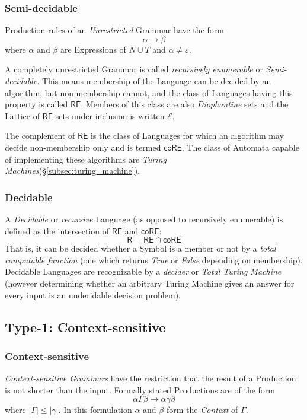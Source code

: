 \documentclass{article}
\begin{document}
\subsubsection{Semi-decidable}\label{subsec:semidecidable}
Production rules of an \emph{Unrestricted} Grammar have the form
\[
    \alpha \rightarrow \beta
\]
where $\alpha$ and $\beta$ are Expressions of $N \cup T$ and $\alpha
\neq \varepsilon$.

A completely unrestricted Grammar is called \emph{recursively
  enumerable} or \emph{Semi-decidable}. This means membership of the
Language can be decided by an algorithm, but non-membership cannot,
and the class of Languages having this property is called
$\mathsf{RE}$. Members of this class are also \emph{Diophantine} sets
and the Lattice of $\mathsf{RE}$ sets under inclusion is written
$\mathcal{E}$. %

The complement of $\mathsf{RE}$ is the class of Languages for which
an algorithm may decide non-membership only and is termed
$\mathsf{coRE}$. The class of Automata capable of implementing these
algorithms are \emph{Turing Machines}(\S\ref{subsec:turing_machine}).

\subsubsection{Decidable}\label{subsec:decidability}
A \emph{Decidable} or \emph{recursive} Language (as opposed to
recursively enumerable) is defined as the intersection of
$\mathsf{RE}$ and $\mathsf{coRE}$:
\[
    \mathsf{R} = \mathsf{RE} \cap \mathsf{coRE}
\]
That is, it can be decided whether a Symbol is a member or not by a
\emph{total computable function} (one which returns \emph{True} or
\emph{False} depending on membership). Decidable Languages are
recognizable by a \emph{decider} or \emph{Total Turing
  Machine}\cite{kozen97} (however determining whether an arbitrary
Turing Machine gives an answer for every input is an undecidable
decision problem).

\subsection{Type-1: Context-sensitive}

\subsubsection{Context-sensitive}\label{subsec:context_sensitive}
\emph{Context-sensitive Grammars} have the restriction that the result
of a Production is not shorter than the input. Formally stated
Productions are of the form
\[
    \alpha \Gamma \beta \rightarrow \alpha \gamma \beta
\]
where $|\Gamma| \leq |\gamma|$. In this formulation $\alpha$ and $\beta$ form
the \emph{Context} of $\Gamma$.
\end{document}
